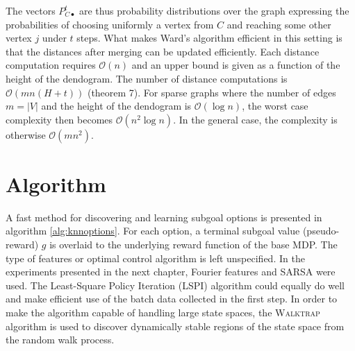 The vectors $P^t_{C\bullet}$ are thus probability distributions over the graph expressing the probabilities of choosing uniformly a vertex from $C$ and reaching some other vertex $j$ under $t$ steps. What makes Ward's algorithm efficient in this setting is that the distances after merging can be updated efficiently. Each distance computation requires $\mathcal{O}(n)$ and an upper bound is given as a function of the height of the dendogram. The number of distance computations is $\mathcal{O}(mn(H + t))$ \parencite{Pons2005} (theorem 7). For sparse graphs where the number of edges $m = |V|$ and the height of the dendogram is $\mathcal{O}(\log n)$, the worst case complexity then becomes $\mathcal{O}(n^2 \log n)$. In the general case, the complexity is otherwise $\mathcal{O}(mn^2)$. 

\section{Algorithm}

A fast method for discovering and learning subgoal options is presented in algorithm \ref{alg:knnoptions}. For each option, a terminal subgoal value (pseudo-reward) $g$ is overlaid to the underlying reward function of the base MDP. The type of features or optimal control algorithm is left unspecified. In the experiments presented in the next chapter, Fourier features and SARSA were used. The Least-Square Policy Iteration (LSPI) \parencite{Lagoudakis2003} algorithm could equally do well and make efficient use of the batch data collected in the first step. In order to make the algorithm capable of handling large state spaces, the \textsc{Walktrap} algorithm is used to discover dynamically stable regions of the state space from the random walk process. 

